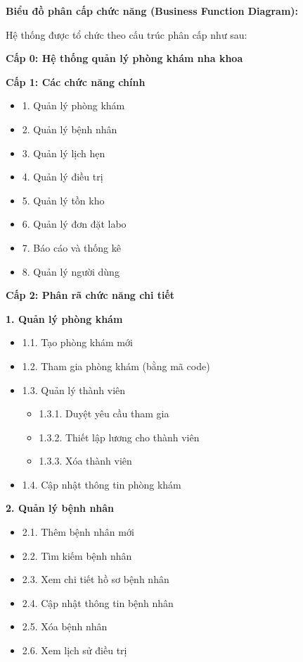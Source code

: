 \vspace{1em}

\textbf{Biểu đồ phân cấp chức năng (Business Function Diagram):}

Hệ thống được tổ chức theo cấu trúc phân cấp như sau:

\textbf{Cấp 0: Hệ thống quản lý phòng khám nha khoa}

\textbf{Cấp 1: Các chức năng chính}
\begin{itemize}
\item 1. Quản lý phòng khám
\item 2. Quản lý bệnh nhân
\item 3. Quản lý lịch hẹn
\item 4. Quản lý điều trị
\item 5. Quản lý tồn kho
\item 6. Quản lý đơn đặt labo
\item 7. Báo cáo và thống kê
\item 8. Quản lý người dùng
\end{itemize}

\textbf{Cấp 2: Phân rã chức năng chi tiết}

\textbf{1. Quản lý phòng khám}
\begin{itemize}
\item 1.1. Tạo phòng khám mới
\item 1.2. Tham gia phòng khám (bằng mã code)
\item 1.3. Quản lý thành viên
    \begin{itemize}
    \item 1.3.1. Duyệt yêu cầu tham gia
    \item 1.3.2. Thiết lập lương cho thành viên
    \item 1.3.3. Xóa thành viên
    \end{itemize}
\item 1.4. Cập nhật thông tin phòng khám
\end{itemize}

\textbf{2. Quản lý bệnh nhân}
\begin{itemize}
\item 2.1. Thêm bệnh nhân mới
\item 2.2. Tìm kiếm bệnh nhân
\item 2.3. Xem chi tiết hồ sơ bệnh nhân
\item 2.4. Cập nhật thông tin bệnh nhân
\item 2.5. Xóa bệnh nhân
\item 2.6. Xem lịch sử điều trị
\end{itemize}

